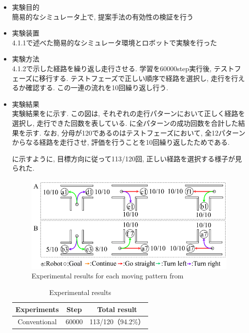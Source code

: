 \begin{itemize}
  \item 実験目的\\
  簡易的なシミュレータ上で, 提案手法の有効性の検証を行う
  \item 実験装置\\
  4.1.1で述べた簡易的なシミュレータ環境とロボットで実験を行った
  \item 実験方法\\
  4.1.2で示した経路を繰り返し走行させる. 学習を60000step実行後, テストフェーズに移行する. テストフェーズで正しい順序で経路を選択し, 走行を行えるか確認する. この一連の流れを10回繰り返し行う.

  \newpage

  \item 実験結果\\
  実験結果をに示す. この図は, それぞれの走行パターンにおいて正しく経路を選択し, 走行できた回数を表している. に全パターンの成功回数を合計した結果を示す. なお, 分母が120であるのはテストフェーズにおいて, 全12パターンからなる経路を走行させ, 評価を行うことを10回繰り返したためである. 
  \par
  に示すように, 目標方向に従って113/120回, 正しい経路を選択する様子が見られた. 

\vspace{1cm}

\begin{figure}[hbtp]
  \centering
 \includegraphics[keepaspectratio, scale=0.5]
      {images/60000step.png}
 \caption{Experimental results for each moving pattern from \cite{mech}}
 \label{Fig:60000step}
\end{figure}

\vspace{1cm}

\begin{table}[hbtp]
  \caption{Experimental results}
  \label{table:result}
  \centering
  \begin{tabular}{|c|c|c|}
    \hline
    Experiments & Step & Total result\\
    \hline
    Conventional & 60000 & 113/120（94.2\%）\\
    \hline
  \end{tabular}
\end{table}

\end{itemize}

